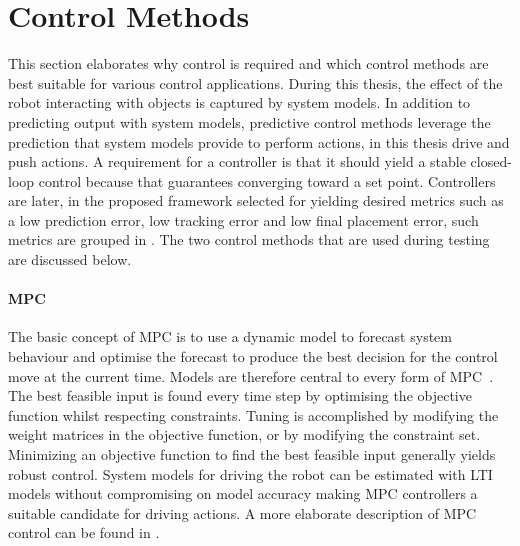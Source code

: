 \section{Control Methods}%
\label{sec:control_methods}

This section elaborates why control is required and which control methods are best suitable for various control applications. During this thesis, the effect of the robot interacting with objects is captured by system models. In addition to predicting output with system models, predictive control methods leverage the prediction that system models provide to perform actions, in this thesis drive and push actions. A requirement for a controller is that it should yield a stable closed-loop control because that guarantees converging toward a set point. Controllers are later, in the proposed framework selected for yielding desired metrics such as a low prediction error, low tracking error and low final placement error, such metrics are grouped in . The two control methods that are used during testing are discussed below.\bs

\paragraph{\acl{MPC}}
The basic concept of \ac{MPC} is to use a dynamic model to forecast system behaviour and optimise the forecast to produce the best decision for the control move at the current time. Models are therefore central to every form of \ac{MPC}~\cite{rawlings_model_2020}. The best feasible input is found every time step by optimising the objective function whilst respecting constraints. Tuning is accomplished by modifying the weight matrices in the objective function, or by modifying the constraint set. Minimizing an objective function to find the best feasible input generally yields robust control. System models for driving the robot can be estimated with \ac{LTI} models without compromising on model accuracy making \ac{MPC} controllers a suitable candidate for driving actions. A more elaborate description of \ac{MPC} control can be found in .\bs

